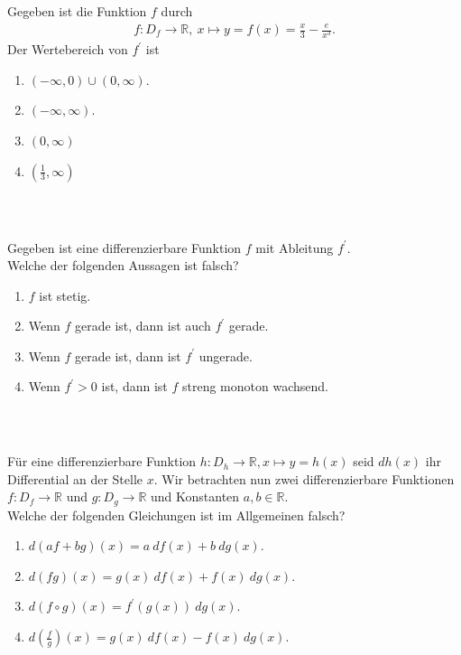 \subsection*{}
Gegeben ist die Funktion $ f $ durch
\begin{align*}
f : D_f \to \mathbb{R}, \ x \mapsto y = f(x) = \frac{x}{3} - \frac{e}{x^3}.
\end{align*}
Der Wertebereich von $ f^\prime$ ist
\renewcommand{\labelenumi}{(\alph{enumi})}
\begin{enumerate}
\item 
$ (- \infty,0) \cup (0,\infty) $.
\item
$ (-\infty,\infty) $.
\item
$ (0, \infty) $
\item
$ ( \frac{1}{3}, \infty) $
\end{enumerate}
\ \\
\subsection*{}
Gegeben ist eine differenzierbare Funktion $ f $ mit Ableitung $ f^\prime $.\\
Welche der folgenden Aussagen ist falsch?
\renewcommand{\labelenumi}{(\alph{enumi})}
\begin{enumerate}
\item 
$ f  $ ist stetig.
\item
Wenn $ f $ gerade ist, dann ist auch $ f^\prime $ gerade.
\item
Wenn $ f $ gerade ist, dann ist $ f^\prime $ ungerade.
\item
Wenn $ f^\prime > 0 $ ist, dann ist $ f $ streng monoton wachsend.
\end{enumerate}
\ \\
\subsection*{}
Für eine differenzierbare Funktion $ h:D_h \to \mathbb{R}, x \mapsto y = h(x) $ seid $ dh(x) $ ihr Differential an der Stelle $ x $.
Wir betrachten nun zwei differenzierbare Funktionen $ f :D_f \to \mathbb{R} $ und $ g: D_g \to \mathbb{R} $ und Konstanten $ a,b \in \mathbb{R} $.\\
Welche der folgenden Gleichungen ist im Allgemeinen falsch?
\renewcommand{\labelenumi}{(\alph{enumi})}
\begin{enumerate}
	\item 
	$ d(af +bg)(x) = a \ df(x) + b \ d g(x) $.
	\item
	$ d(fg)(x) = g(x) \ df(x) + f(x) \ dg(x) $.
	\item
	$ d(f\circ g) (x) = f^\prime(g(x)) \ dg(x) $.
	\item
	$ d \left( \frac{f}{g} \right)(x) = g(x) \ df(x) - f(x) \ dg(x) $.
\end{enumerate}

